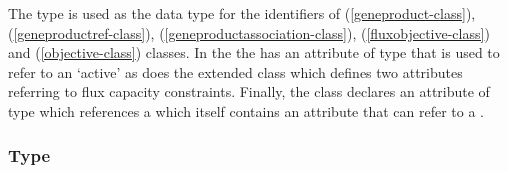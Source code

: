 The  type is used as the data type for the identifiers of \GeneProduct (\ref{geneproduct-class}),
\GeneProductRef (\ref{geneproductref-class}),
\GeneProductAssociation (\ref{geneproductassociation-class}),
\FluxObjective (\ref{fluxobjective-class}) and \Objective (\ref{objective-class}) classes. In the \FBCPackage the
\ListOfObjectives has an attribute of type  that is used to
refer to an `active' \Objective as does the extended \Reaction class which defines two attributes referring to flux capacity constraints. Finally, the \GeneProductRef class declares an attribute of type  which references a \GeneProduct which itself contains an attribute that can refer to a \Species.

%

%

\subsubsection{Type }
\label{primtype-fbctype}

